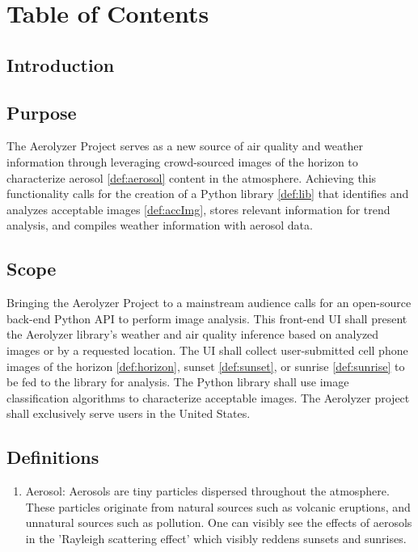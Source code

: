 \documentclass[journal,10pt,draftclsnofoot,onecolumn]{IEEEtran}
\begin{document}
\section{Table of Contents}
\tableofcontents
\clearpage

\begin{singlespace}

\section{Introduction}

	\subsection{Purpose}
		The Aerolyzer Project serves as a new source of air quality and weather information through leveraging crowd-sourced images of the horizon to characterize aerosol \ref{def:aerosol} content in the atmosphere.
		Achieving this functionality calls for the creation of a Python library \ref{def:lib} that identifies and analyzes acceptable images \ref{def:accImg}, stores relevant information for trend analysis, and compiles weather information with aerosol data. 

	\subsection{Scope}
		Bringing the Aerolyzer Project to a mainstream audience calls for an open-source back-end Python API to perform image analysis.
		This front-end UI shall present the Aerolyzer library's weather and air quality inference based on analyzed images or by a requested location.
		The UI shall collect user-submitted cell phone images of the horizon \ref{def:horizon}, sunset \ref{def:sunset}, or sunrise \ref{def:sunrise} to be fed to the library for analysis.
		The Python library shall use image classification algorithms to characterize acceptable images.
		The Aerolyzer project shall exclusively serve users in the United States.

	\subsection{Definitions}
		\begin{enumerate}
			\item \label{def:aerosol} Aerosol: Aerosols are tiny particles dispersed throughout the atmosphere.
			These particles originate from natural sources such as volcanic eruptions, and unnatural sources such as pollution. 
			One can visibly see the effects of aerosols in the 'Rayleigh scattering effect' which visibly reddens sunsets and sunrises.


\end{enumerate}
\end{singlespace}
\end{document}
